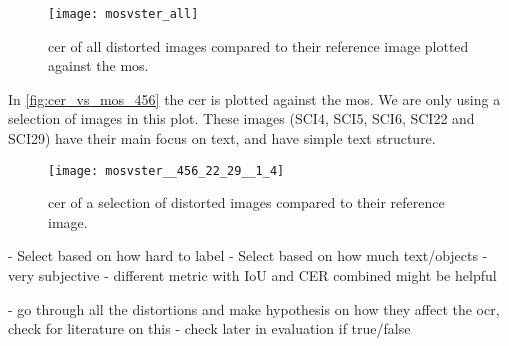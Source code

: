 \begin{figure}[h]
    \centering
    \texttt{[image: mosvster\_all]}
    \caption{\gls{cer} of all distorted images compared to their reference image plotted against the \gls{mos}.}
    \label{fig:cer_vs_mos}
\end{figure}

In \autoref{fig:cer_vs_mos_456} the \gls{cer} is plotted against the \gls{mos}.
We are only using a selection of images in this plot.
These images (SCI4, SCI5, SCI6, SCI22 and SCI29) have their main focus on text, and have simple text structure.
\begin{figure}[h]
    \centering
    \texttt{[image: mosvster\_\_456\_22\_29\_\_1\_4]}
    \caption{\gls{cer} of a selection of distorted images compared to their reference image.}
    \label{fig:cer_vs_mos_456}
\end{figure}

- Select based on how hard to label
- Select based on how much text/objects
- very subjective
- different metric with IoU and CER combined might be helpful

- go through all the distortions and make hypothesis on how they affect the ocr, check for literature on this
- check later in evaluation if true/false
